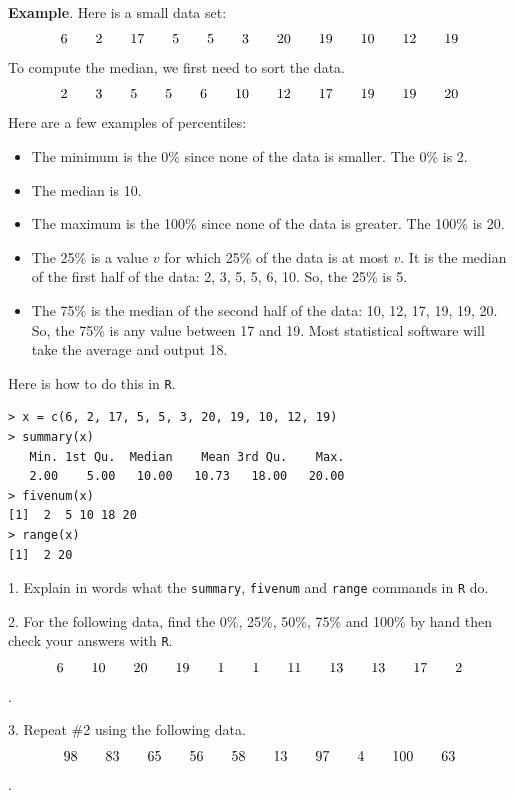 \documentclass[10pt]{article}
\begin{document}
\textbf{Example}.  Here is a small data set:\vspace{-5pt}
\[6\HS 2\HS 17\HS 5\HS 5\HS 3\HS 20\HS 19\HS 10\HS 12\HS 19\vspace{-5pt}\]
To compute the median, we first need to sort the data.\vspace{-5pt}
\[2\HS 3\HS  5\HS  5\HS  6\HS 10\HS 12\HS 17\HS 19\HS 19\HS 20\vspace{-5pt}\]
Here are a few examples of percentiles:
\begin{itemize}
\item The minimum is the 0\% since none of the data is smaller.  The 0\% is 2.
\item The median is 10.
\item The maximum is the 100\% since none of the data is greater.  The 100\% is 20.
\item The 25\% is a value $v$ for which 25\% of the data is at most $v$.  It is 
   the median of the first half of the data: 2, 3, 5, 5, 6, 10.  So, the 25\% is 5.
\item The 75\% is the median of the second half of the data:  10, 12, 17, 19, 19, 20.
   So, the 75\% is any value  between 17 and 19.  Most statistical software will 
   take the average and output 18.
\end{itemize}
Here is how to do this in \texttt{R}.\vspace{-8pt}
\begin{verbatim}
> x = c(6, 2, 17, 5, 5, 3, 20, 19, 10, 12, 19)
> summary(x)
   Min. 1st Qu.  Median    Mean 3rd Qu.    Max. 
   2.00    5.00   10.00   10.73   18.00   20.00 
> fivenum(x)  
[1]  2  5 10 18 20
> range(x)
[1]  2 20
\end{verbatim}\vspace{-5pt}

1. Explain in words what the \texttt{summary}, \texttt{fivenum} and
\texttt{range} commands in \texttt{R} do.
\vspace{.7in}

2. For the following data, find the 0\%, 25\%, 50\%, 75\% and 100\%
by hand then check your answers with \texttt{R}.\vspace{-3pt}
\[6\hspace{20pt} 10\hspace{20pt} 20\hspace{20pt} 19\hspace{20pt}  1\hspace{20pt}  1\hspace{20pt} 11\hspace{20pt} 13\hspace{20pt} 13\hspace{20pt} 17\hspace{20pt}  2\].
\vspace{.7in}

3. Repeat \#2 using the following data.\vspace{-3pt}
\[98\hspace{20pt} 83\hspace{20pt} 65\hspace{20pt} 56\hspace{20pt}  58\hspace{20pt}  13\hspace{20pt} 97\hspace{20pt} 4\hspace{20pt} 100\hspace{20pt} 63\].


\vfill
\eject
\end{document}
